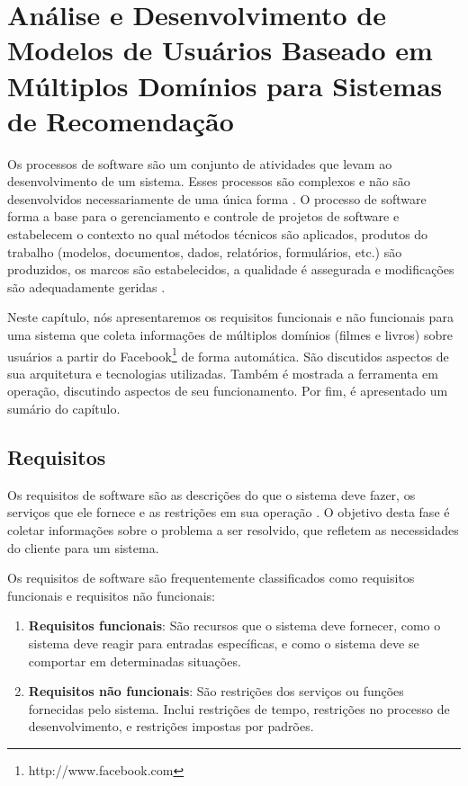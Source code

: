 \chapter{Análise e Desenvolvimento de Modelos de Usuários Baseado em Múltiplos Domínios para Sistemas de Recomendação}
\label{cap:multiDomainUserModel}



Os processos de software são um conjunto de atividades que levam ao desenvolvimento de um sistema. Esses processos são complexos e não são desenvolvidos necessariamente de uma única forma \citep{Sommerville10}. O processo de software forma a base para o gerenciamento e controle de projetos de software e estabelecem o contexto no qual métodos técnicos são aplicados, produtos do trabalho (modelos, documentos, dados, relatórios, formulários, etc.) são produzidos, os marcos são estabelecidos, a qualidade é assegurada e modificações são adequadamente geridas \citep{Pressman:2009:SEP:1593949}.

Neste capítulo, nós apresentaremos os requisitos funcionais e não funcionais para uma sistema que coleta informações de múltiplos domínios (filmes e livros) sobre usuários a partir do Facebook\footnote{http://www.facebook.com} de forma automática. São discutidos aspectos de sua arquitetura e tecnologias utilizadas. Também é mostrada a ferramenta em operação, discutindo aspectos de seu funcionamento. Por fim, é apresentado um sumário do capítulo.



\section{Requisitos}

Os requisitos de software são as descrições do que o sistema deve fazer, os serviços que ele fornece e as restrições em sua operação \citep{Sommerville10}. O objetivo desta fase é coletar informações sobre o problema a ser resolvido, que refletem as necessidades do cliente para um sistema.

Os requisitos de software são frequentemente classificados como requisitos funcionais e requisitos não funcionais:

\begin{enumerate}
	\item{\textbf{Requisitos funcionais}: São recursos que o sistema deve fornecer, como o sistema deve reagir para entradas específicas, e como o sistema deve se comportar em determinadas situações.}
	
	\item{\textbf{Requisitos não funcionais}: São restrições dos serviços ou funções fornecidas pelo sistema. Inclui restrições de tempo, restrições no processo de desenvolvimento, e restrições impostas por padrões.}
\end{enumerate}

